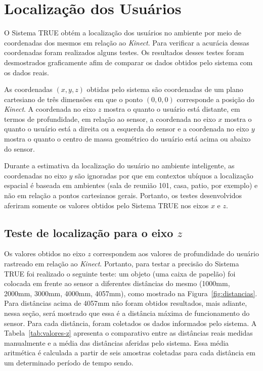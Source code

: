 \section{Localização dos Usuários}
\label{sec:testes-localizacao}

O Sistema TRUE obtém a localização dos usuários no ambiente por meio de
coordenadas dos mesmos em relação ao \textit{Kinect}. Para verificar a acurácia
dessas coordenadas foram realizados alguns testes. Os resultados desses testes
foram desmostrados graficamente afim de comparar os dados obtidos
pelo sistema com os dados reais.

As coordenadas $\displaystyle (x, y, z)$ obtidas pelo sistema são coordenadas de
um plano cartesiano de três dimensões em que o ponto $\displaystyle (0, 0, 0)$
corresponde a posição do \textit{Kinect}. A coordenada no eixo  $\displaystyle
z$ mostra o quanto o usuário está distante, em termos de profundidade, em
relação ao sensor, a coordenada no eixo  $\displaystyle x$ mostra o quanto o
usuário está a direita ou a esquerda do sensor e a coordenada no eixo 
$\displaystyle y$ mostra o quanto o centro de massa geométrico do usuário está
acima ou abaixo do sensor.

Durante a estimativa da localização do usuário no ambiente inteligente, as
coordenadas no eixo  $\displaystyle y$ são ignoradas por que em contextos
ubíquos a localização espacial é baseada em ambientes (sala de
reunião 101, casa, patio, por exemplo) e não em relação a pontos cartesianos
gerais. Portanto, os testes desenvolvidos aferiram somente os valores obtidos
pelo Sistema TRUE nos eixos $\displaystyle x$ e $\displaystyle z$.

\subsection{Teste de localização para o eixo $\displaystyle z$}

	Os valores obtidos no eixo $\displaystyle z$ correspondem aos valores de
	profundidade do usuário rastreado em relação ao \textit{Kinect}. Portanto, para
	testar a precisão do Sistema TRUE foi realizado o seguinte teste: um objeto (uma
	caixa de papelão) foi colocada em frente ao sensor a diferentes distâncias do
	mesmo (1000mm, 2000mm, 3000mm, 4000mm, 4057mm), como mostrado
	na Figura~\ref{fig:distancias}. Para distâncias acima de 4057mm não foram
	obtidos resultados, mais adiante, nessa seção, será mostrado que essa é a
	distância máxima de funcionamento do sensor. Para cada distância, foram
	coletados os dados informados pelo sistema. A Tabela~\ref{tab:valores-z}
	apresenta o comparativo entre as distâncias reais medidas manualmente e a
	média das distâncias aferidas pelo sistema. Essa média aritmética é calculada
	a partir de seis amostras coletadas para cada distância em um determinado período de tempo sendo.

